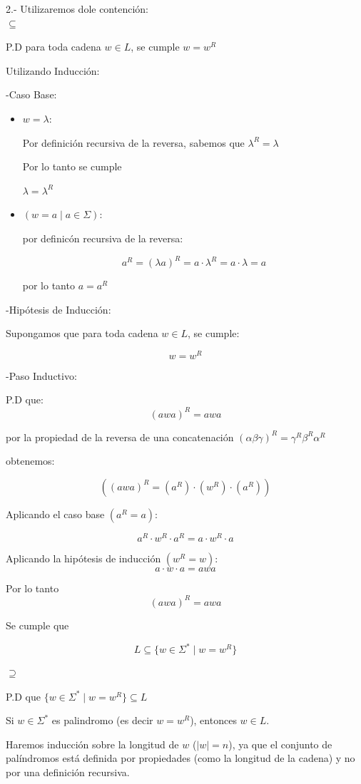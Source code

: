 2.- Utilizaremos dole contención: \\

\underline{$\subseteq$}

P.D para toda cadena $w\in L$, se cumple $w=w^{R}$

Utilizando Inducción:

-Caso Base:
\begin{itemize}


\item $w =\lambda$:

Por definición recursiva de la reversa, sabemos que $\lambda^{R}=\lambda$

Por lo tanto se cumple

$\lambda = \lambda^{R}$

\item $(w = a \mid a \in\Sigma)$:

por definicón recursiva de la reversa:

$$a^{R}=(\lambda a)^{R}=a\cdot\lambda^{R}=a\cdot\lambda=a$$

por lo tanto $a = a^{R}$
\end{itemize}
-Hipótesis de Inducción:

Supongamos que para toda cadena $w\in L$, se cumple:

$$w=w^{R}$$

-Paso Inductivo:

P.D que: 
$$(awa)^{R}=awa$$

por la propiedad de la reversa de una concatenación $(\alpha\beta\gamma)^{R}=\gamma^{R}\beta^{R}\alpha^{R}$ 

obtenemos:

$$((awa)^{R}=(a^{R})\cdot(w^{R})\cdot(a^{R}))$$

Aplicando el caso base $(a^{R}=a)$:

$$a^{R}\cdot w^{R}\cdot a^{R}=a\cdot w^{R}\cdot a$$

Aplicando la hipótesis de inducción $(w^{R}=w)$:
$$a\cdot w\cdot a=awa$$

Por lo tanto 
$$(awa)^{R}=awa$$

Se cumple que 

$$L\subseteq\{w\in\Sigma^{*}\mid w=w^{R}\}$$

\medskip
\underline{$\supseteq$}

P.D que $\{w\in\Sigma^{*}\mid w=w^{R}\}\subseteq L$

Si $w\in\Sigma^{*}$ es palindromo (es decir $w=w^{R}$), entonces $w\in L$.

Haremos inducción sobre la longitud de $w$ ($|w|= n$), ya que el conjunto de palíndromos está definida por propiedades (como la longitud de la cadena) y no por una definición recursiva.

